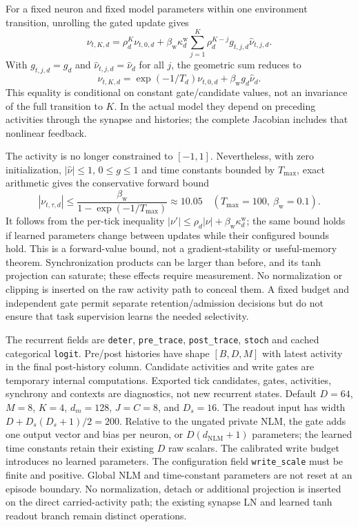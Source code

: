\documentclass{article}
\begin{document}
For a fixed neuron and fixed model parameters within one environment transition, unrolling the gated update gives
\begin{equation}
\nu_{t,K,d}=\rho_d^K\nu_{t,0,d}
+\beta_{\mathrm w}\kappa_d^{\mathrm w}\sum_{j=1}^{K}
\rho_d^{K-j}g_{t,j,d}\widehat\nu_{t,j,d}.
\label{eq:ct_unrolled_activity}
\end{equation}
With $g_{t,j,d}=g_d$ and $\widehat\nu_{t,j,d}=\widehat\nu_d$ for all $j$, the geometric sum reduces to
\begin{equation}
\nu_{t,K,d}=\exp(-1/T_d)\nu_{t,0,d}
+\beta_{\mathrm w}g_d\widehat\nu_d.
\label{eq:ct_constant_write}
\end{equation}
This equality is conditional on constant gate/candidate values, not an invariance of the full transition to $K$. In the actual model they depend on preceding activities through the synapse and histories; the complete Jacobian includes that nonlinear feedback.

The activity is no longer constrained to $[-1,1]$. Nevertheless, with zero initialization, $|\widehat\nu|\le1$, $0\le g\le1$ and time constants bounded by $T_{\max}$, exact arithmetic gives the conservative forward bound
\begin{equation}
|\nu_{t,\tau,d}|\le
\frac{\beta_{\mathrm w}}{1-\exp(-1/T_{\max})}
\approx10.05\quad(T_{\max}=100,\ \beta_{\mathrm w}=0.1).
\label{eq:ct_activity_bound}
\end{equation}
It follows from the per-tick inequality $|\nu'|\le\rho_d|\nu|+\beta_{\mathrm w}\kappa_d^{\mathrm w}$; the same bound holds if learned parameters change between updates while their configured bounds hold. This is a forward-value bound, not a gradient-stability or useful-memory theorem. Synchronization products can be larger than before, and its tanh projection can saturate; these effects require measurement. No normalization or clipping is inserted on the raw activity path to conceal them. A fixed budget and independent gate permit separate retention/admission decisions but do not ensure that task supervision learns the needed selectivity.

The recurrent fields are \texttt{deter}, \texttt{pre\_trace}, \texttt{post\_trace}, \texttt{stoch} and cached categorical \texttt{logit}. Pre/post histories have shape $[B,D,M]$ with latest activity in the final post-history column. Candidate activities and write gates are temporary internal computations. Exported tick candidates, gates, activities, synchrony and contexts are diagnostics, not new recurrent states. Default $D=64$, $M=8$, $K=4$, $d_m=128$, $J=C=8$, and $D_s=16$. The readout input has width $D+D_s(D_s+1)/2=200$. Relative to the ungated private NLM, the gate adds one output vector and bias per neuron, or $D(d_{\mathrm{NLM}}+1)$ parameters; the learned time constants retain their existing $D$ raw scalars. The calibrated write budget introduces no learned parameters. The configuration field \texttt{write\_scale} must be finite and positive. Global NLM and time-constant parameters are not reset at an episode boundary. No normalization, detach or additional projection is inserted on the direct carried-activity path; the existing synapse LN and learned tanh readout branch remain distinct operations.
\end{document}
